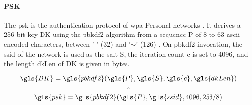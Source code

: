 \paragraph{PSK}

The \gls{psk} is the authentication protocol of \gls{wpa}-Personal networks \cite{wifi_state}. It derives a 256-bit key \gls{DK} using the \gls{pbkdf2} algorithm \cite{rfc8018} from a sequence \gls{P} of 8 to 63 \gls{ascii}-encoded characters, between ' ' (32) and '$\sim$' (126) \cite{ieee_80211_2020}. On \gls{pbkdf2} invocation, the \gls{ssid} of the network is used as the salt \gls{S}, the iteration count \gls{c} is set to 4096, and the length \gls{dkLen} of \gls{DK} is given in bytes.

\[ \gls{DK} = \gls{pbkdf2}(\gls{P}, \gls{S}, \gls{c}, \gls{dkLen}) \]
\[ \therefore \]
\[ \gls{psk} = \gls{pbkdf2}(\gls{P}, \gls{ssid}, 4096, 256 / 8) \]
